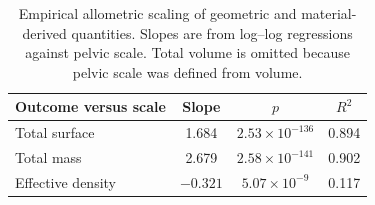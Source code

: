 \documentclass[openacc]{rsproca_new}
\begin{document}
\begin{table}[p]
\centering
\caption{Empirical allometric scaling of geometric and material-derived quantities. Slopes are from log--log regressions against pelvic scale. Total volume is omitted because pelvic scale was defined from volume.}
\label{tab:allometry}
\begin{tabular}{lccc}
\toprule
Outcome versus scale & Slope & $p$ & $R^2$ \\
\midrule
Total surface & 1.684 & $2.53 \times 10^{-136}$ & 0.894 \\
Total mass & 2.679 & $2.58 \times 10^{-141}$ & 0.902 \\
Effective density & $-0.321$ & $5.07 \times 10^{-9}$ & 0.117 \\
\bottomrule
\end{tabular}
\end{table}
\end{document}
